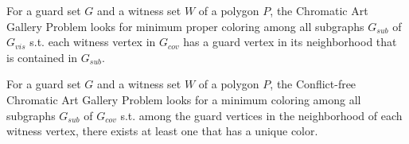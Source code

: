 \begin{definition}
For a guard set $G$ and a witness set $W$ of a polygon $P$, the Chromatic Art Gallery Problem looks for minimum proper coloring among all subgraphs $G_{sub}$ of $G_{vis}$ s.t. each witness vertex in $G_{cov}$ has a guard vertex in its neighborhood that is contained in $G_{sub}$.
\end{definition}

\begin{definition}
For a guard set $G$ and a witness set $W$ of a polygon $P$, the Conflict-free Chromatic Art Gallery Problem looks for a minimum coloring among all subgraphs $G_{sub}$ of $G_{cov}$ s.t. among the guard vertices in the neighborhood of each witness vertex, there exists at least one that has a unique color.
\end{definition}